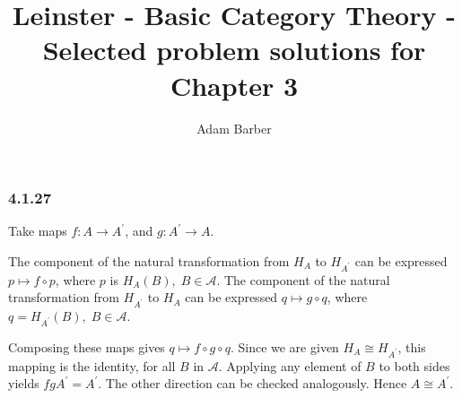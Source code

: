 \documentclass{article}
\begin{document}
\title{Leinster - Basic Category Theory - Selected problem solutions for Chapter 3}
\author{Adam Barber}

\maketitle

\subsubsection*{4.1.27}

Take maps $f: A \rightarrow A^\prime$, and $g: A^\prime \rightarrow A$.

The component of the natural transformation from $H_A$ to $H_{A^\prime}$  can be expressed $p \mapsto f \circ p$, where $p$ is $H_A(B), \;B \in \mathcal{A}$. The component of the natural transformation from $H_{A^\prime}$ to $H_A$ can be expressed $q \mapsto g \circ q$, where $q = H_{A^\prime}(B), \; B \in \mathcal{A}$.

Composing these maps gives $q \mapsto f \circ g \circ q$. Since we are given $H_A \cong H_{A^\prime}$, this mapping is the identity, for all $B$ in $\mathcal{A}$. Applying any element of $B$ to both sides yields $fgA^\prime = A^\prime$. The other direction can be checked analogously. Hence $A \cong A^\prime$.
\end{document}
